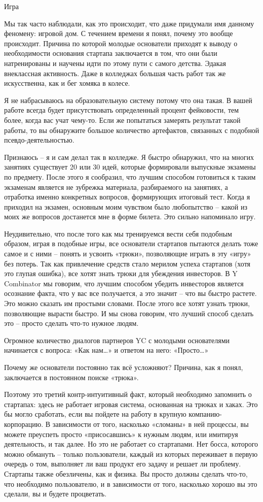 \documentclass[ebook,12pt,oneside,openany]{memoir}
\begin{document}
Игра

Мы так часто наблюдали, как это происходит, что даже придумали имя
данному феномену: игровой дом. С течением времени я понял, почему это
вообще происходит. Причина по которой молодые основатели приходят к
выводу о необходимости основания стартапа заключается в том, что они
были натренированы и научены идти по этому пути с самого детства.
Эдакая внеклассная активность. Даже в колледжах большая часть работ
так же искусственна, как и бег хомяка в колесе.

Я не набрасываюсь на образовательную систему потому что она такая. В
вашей работе всегда будет присутствовать определенный процент
фейковости, тем более, когда вас учат чему-то. Если же попытаться
замерять результат такой работы, то вы обнаружите большое количество
артефактов, связанных с подобной псевдо-деятельностью.

Признаюсь – я и сам делал так в колледже. Я быстро обнаружил, что на
многих занятиях существует 20 или 30 идей, которые формировали
выпускные экзамены по предмету. После этого я сообразил, что лучшим
способом готовиться к таким экзаменам является не зубрежка материала,
разбираемого на занятиях, а отработка именно конкретных вопросов,
формирующих итоговый тест. Когда я приходил на экзамен, основным моим
чувством было любопытство – какой из моих же вопросов достанется мне в
форме билета. Это сильно напоминало игру.

Неудивительно, что после того как мы тренируемся вести себя подобным
образом, играя в подобные игры, все основатели стартапов пытаются
делать тоже самое и с ними – понять и усвоить «трюки», позволяющие
играть в эту «игру» без потерь. Так как привлечение средств стало
мерилом успеха стартапов (хотя это глупая ошибка), все хотят знать
трюки для убеждения инвесторов. В Y Combinator мы говорим, что лучшим
способом убедить инвесторов является осознание факта, что у вас все
получается, а это значит – что вы быстро растете. Это можно сказать им
простыми словами. После этого все хотят узнать трюки, позволяющие
вырасти быстро. И мы снова говорим, что лучший способ сделать это –
просто сделать что-то нужное людям.

Огромное количество диалогов партнеров YC с молодыми основателями
начинается с вопроса: «Как нам…» и ответом на него: «Просто…»

Почему же основатели постоянно так всё усложняют? Причина, как я
понял, заключается в постоянном поиске «трюка».

Поэтому это третий контр-интуитивный факт, который необходимо
запомнить о стартапах: здесь не работает игровая система, основанная
на трюках и хаках. Это бы могло сработать, если вы пойдете на работу в
крупную компанию-корпорацию. В зависимости от того, насколько
«сломаны» в ней процессы, вы можете преуспеть просто «присосавшись» к
нужным людям, или имитируя деятельность, и так далее. Но это не
работает со стартапами. Нет босса, которого можно обмануть – только
пользователи, каждый из которых переживает в первую очередь о том,
выполняет ли ваш продукт его задачу и решает ли проблему. Стартапы
также обезличены, как и физика. Вы просто должны сделать что-то, что
необходимо пользователю, и в зависимости от того, насколько хорошо вы
это сделали, вы и будете процветать.
\end{document}
